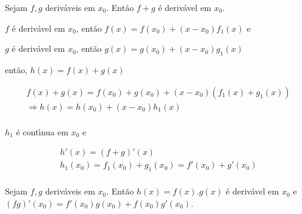 \documentclass{book}
\begin{document}
\begin{teo}

Sejam $f,g$ deriv\'aveis em $x_0 $. Ent\~ao $f + g$ \'{e} deriv\'avel
em $x_0 $.

\end{teo}

\begin{dem}

$f$ \'{e} deriv\'avel em $x_0 $, ent\~ao $f\left( x \right) = f\left( {x_0
} \right) + \left( {x - x_0 } \right)f_1 \left( x \right)$ e

$g$ \'{e} deriv\'avel em $x_0 $, ent\~ao $g\left( x \right) = g\left( {x_0
} \right) + \left( {x - x_0 } \right)g_1 \left( x \right)$

ent\~ao, $h\left( x \right) = f\left( x \right) + g\left( x \right)$

\[
\begin{array}{l}
f\left( x \right) + g\left( x \right) = f\left( {x_0 } \right) + g\left(
{x_0 } \right) + \left( {x - x_0 } \right)\left( {f_1 \left( x \right) + g_1
\left( x \right)} \right) \\
\Rightarrow h\left( x \right) = h\left( {x_0 } \right) + \left( {x - x_0 }
\right)h_1 \left( x \right) \\
\end{array}
\]

$h_1 $ \'{e} cont\'{\i}nua em $x_0 $ e

\[
\begin{array}{l}
h'\left( x \right) = \left( {f + g} \right)'\left( x \right) \\
h_1 \left( {x_0 } \right) = f_1 \left( {x_0 } \right) + g_1 \left( {x_0 }
\right) = f'\left( {x_0 } \right) + g'\left( {x_0 } \right) \\
\end{array}
\]

\end{dem}

\begin{teo}

Sejam $f,g$ deriv\'aveis em $x_0 $. Ent\~ao $h\left( x \right) = f\left(
x \right).g\left( x \right)$ \'{e} deriv\'avel em $x_0 $ e $\left( {fg}
\right)'\left( {x_0 } \right) = f'\left( {x_0 } \right)g\left( {x_0 }
\right) + f\left( {x_0 } \right)g'\left( {x_0 } \right)$.

\end{teo}
\end{document}
